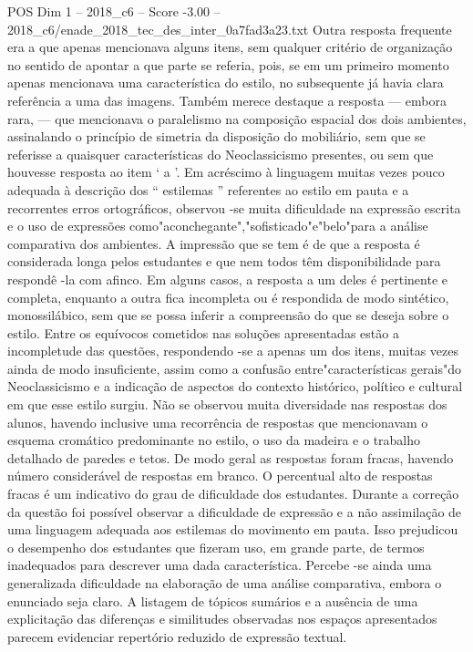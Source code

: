 \begin{textsample}{POS Dim 1 – 2018\_c6 – Score -3.00 – 2018\_c6/enade\_2018\_tec\_des\_inter\_0a7fad3a23.txt}
Outra resposta frequente era a que apenas mencionava alguns itens, sem qualquer critério de organização no sentido de apontar a que parte se referia, pois, se em um primeiro momento apenas mencionava uma característica do estilo, no subsequente já havia clara referência a uma das imagens.
Também merece destaque a resposta — embora rara, — que mencionava o paralelismo na composição espacial dos dois ambientes, assinalando o princípio de simetria da disposição do mobiliário, sem que se referisse a quaisquer características do Neoclassicismo presentes, ou sem que houvesse resposta ao item ‘ a ’.
Em acréscimo à linguagem muitas vezes pouco adequada à descrição dos “ estilemas ” referentes ao estilo em pauta e a recorrentes erros ortográficos, observou -se muita dificuldade na expressão escrita e o uso de expressões como"aconchegante","sofisticado"e"belo"para a análise comparativa dos ambientes.
A impressão que se tem é de que a resposta é considerada longa pelos estudantes e que nem todos têm disponibilidade para respondê -la com afinco.
Em alguns casos, a resposta a um deles é pertinente e completa, enquanto a outra fica incompleta ou é respondida de modo sintético, monossilábico, sem que se possa inferir a compreensão do que se deseja sobre o estilo.
Entre os equívocos cometidos nas soluções apresentadas estão a incompletude das questões, respondendo -se a apenas um dos itens, muitas vezes ainda de modo insuficiente, assim como a confusão entre"características gerais"do Neoclassicismo e a indicação de aspectos do contexto histórico, político e cultural em que esse estilo surgiu.
Não se observou muita diversidade nas respostas dos alunos, havendo inclusive uma recorrência de respostas que mencionavam o esquema cromático predominante no estilo, o uso da madeira e o trabalho detalhado de paredes e tetos.
De modo geral as respostas foram fracas, havendo número considerável de respostas em branco.
O percentual alto de respostas fracas é um indicativo do grau de dificuldade dos estudantes.
Durante a correção da questão foi possível observar a dificuldade de expressão e a não assimilação de uma linguagem adequada aos estilemas do movimento em pauta.
Isso prejudicou o desempenho dos estudantes que fizeram uso, em grande parte, de termos inadequados para descrever uma dada característica.
Percebe -se ainda uma generalizada dificuldade na elaboração de uma análise comparativa, embora o enunciado seja claro.
A listagem de tópicos sumários e a ausência de uma explicitação das diferenças e similitudes observadas nos espaços apresentados parecem evidenciar repertório reduzido de expressão textual.

\end{textsample}
